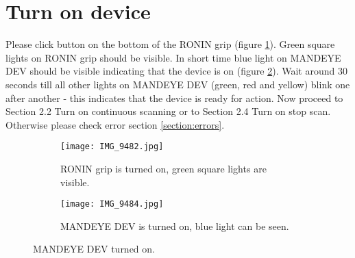 \section{Turn on device}
Please click button on the bottom of the RONIN grip (figure \ref{fig:m21}). 
Green square lights on RONIN grip should be visible. In short time blue light on MANDEYE DEV should be visible indicating that the device is on (figure \ref{fig:m22}). Wait around 30 seconds till all other lights on MANDEYE DEV (green, red and yellow) blink one after another - this indicates that the device is ready for action. Now proceed to Section 2.2 Turn on continuous scanning or to Section 2.4 Turn on stop scan.
Otherwise please check error section \ref{section:errors}.
\begin{figure}[H]
	\centering
	\begin{subfigure}[b]{0.45\textwidth}
		\centering
		\texttt{[image: IMG\_9482.jpg]}
		\caption{RONIN grip is turned on, green square lights are visible.}
		\label{fig:m21}
	\end{subfigure}
	\hfill
	\begin{subfigure}[b]{0.45\textwidth}
		\centering
		\texttt{[image: IMG\_9484.jpg]}
		\caption{MANDEYE DEV is turned on, blue light can be seen.}
		\label{fig:m22}
	\end{subfigure}
	\caption{MANDEYE DEV turned on.}
	\label{fig:mandeye_hardware2}
\end{figure}
